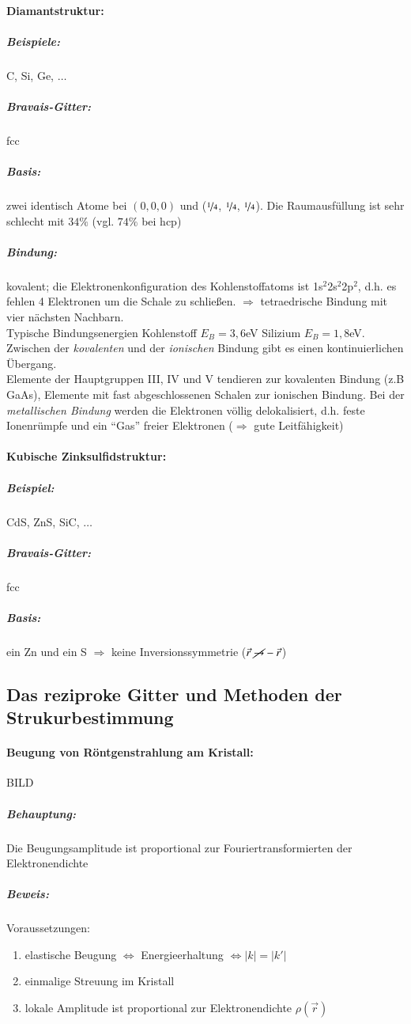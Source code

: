 \documentclass[paper=A4,12pt,pagesize,twoside,BCOR=8mm,ngerman]{scrartcl}
\newcommand{\abs}[1]{\left| #1 \right|} %
\begin{document}
			\paragraph*{Diamantstruktur:}
				\subparagraph*{Beispiele:} C, Si, Ge, $\ldots${}
				\subparagraph*{Bravais-Gitter:} fcc
				\subparagraph*{Basis:} zwei identisch Atome bei 
				$(0,0,0)$ und ($\nicefrac{1}{4}$, $\nicefrac{1}{4}$, 
				$\nicefrac{1}{4}$). Die Raumausfüllung ist sehr 
				schlecht mit $34\%$ (vgl. $74\%$ bei hcp)
				\subparagraph*{Bindung:} kovalent; die 
				Elektronenkonfiguration des Kohlenstoffatoms ist 
				1s$^{2}$2s$^{2}$2p$^{2}$, d.h. es fehlen 4 Elektronen 
				um die Schale zu schließen. $\Rightarrow$ tetraedrische 
				Bindung mit vier nächsten Nachbarn.\\Typische 
				Bindungsenergien Kohlenstoff $E_{B} = 3,6$eV Silizium 
				$E_{B} = 1,8$eV. Zwischen der \emph{kovalenten} und der
				\emph{ionischen} Bindung gibt es einen kontinuierlichen 
				Übergang.\\Elemente der Hauptgruppen	\textsc{III}, 
				\textsc{IV} und \textsc{V} tendieren zur kovalenten 
				Bindung (z.B GaAs), Elemente mit fast abgeschlossenen 
				Schalen zur ionischen Bindung. Bei der 
				\emph{metallischen Bindung} werden die Elektronen 
				völlig delokalisiert, d.h. feste Ionenrümpfe und ein 
				"`Gas"' freier Elektronen ($\Rightarrow$ gute 
				Leitfähigkeit)			
			\paragraph*{Kubische Zinksulfidstruktur:}
				\subparagraph*{Beispiel:} CdS, ZnS, SiC, $\ldots$
				\subparagraph*{Bravais-Gitter:} fcc
				\subparagraph*{Basis:} ein Zn und ein S $\Rightarrow$ 
				keine Inversionssymmetrie ($\vec{r} \; 
				\cancel{\rightarrow} -\vec{r}$)	
	
	\subsection{Das reziproke Gitter und Methoden der Strukurbestimmung}
		\paragraph{Beugung von Röntgenstrahlung am Kristall:}
			BILD
			\subparagraph{Behauptung:} Die Beugungsamplitude ist 
			proportional zur Fouriertransformierten der Elektronendichte
			\subparagraph{Beweis:} Voraussetzungen:
				\begin{enumerate}
					\item	elastische Beugung $\Leftrightarrow$ 
					Energieerhaltung $\Leftrightarrow \abs{k} = 
					\abs{k'}$
					\item	einmalige Streuung im Kristall
					\item	lokale Amplitude ist proportional zur 
					Elektronendichte $\rho (\vec{r})$
				\end{enumerate}
		
\end{document}
